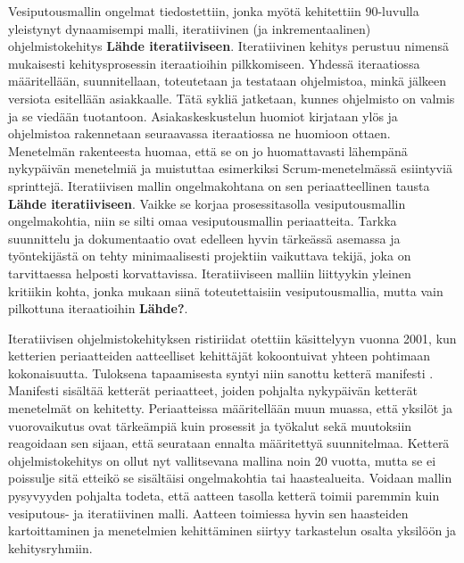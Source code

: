 Vesiputousmallin ongelmat tiedostettiin, jonka myötä kehitettiin 90-luvulla yleistynyt dynaamisempi malli, iteratiivinen (ja inkrementaalinen) ohjelmistokehitys \textbf{Lähde iteratiiviseen}. Iteratiivinen kehitys perustuu nimensä mukaisesti kehitysprosessin iteraatioihin pilkkomiseen. Yhdessä iteraatiossa määritellään, suunnitellaan, toteutetaan ja testataan ohjelmistoa, minkä jälkeen versiota esitellään asiakkaalle. Tätä sykliä jatketaan, kunnes ohjelmisto on valmis ja se viedään tuotantoon. Asiakaskeskustelun huomiot kirjataan ylös ja ohjelmistoa rakennetaan seuraavassa iteraatiossa ne huomioon ottaen. Menetelmän rakenteesta huomaa, että se on jo huomattavasti lähempänä nykypäivän menetelmiä ja muistuttaa esimerkiksi Scrum-menetelmässä \cite{SCRUMORG} esiintyviä sprinttejä. Iteratiivisen mallin ongelmakohtana on sen periaatteellinen tausta \textbf{Lähde iteratiiviseen}. Vaikke se korjaa prosessitasolla vesiputousmallin ongelmakohtia, niin se silti omaa vesiputousmallin periaatteita. Tarkka suunnittelu ja dokumentaatio ovat edelleen hyvin tärkeässä asemassa ja työntekijästä on tehty minimaalisesti projektiin vaikuttava tekijä, joka on tarvittaessa helposti korvattavissa. Iteratiiviseen malliin liittyykin yleinen kritiikin kohta, jonka mukaan siinä toteutettaisiin vesiputousmallia, mutta vain pilkottuna iteraatioihin \textbf{Lähde?}. 

Iteratiivisen ohjelmistokehityksen ristiriidat otettiin käsittelyyn vuonna 2001, kun ketterien periaatteiden aatteelliset kehittäjät kokoontuivat yhteen pohtimaan kokonaisuutta. Tuloksena tapaamisesta syntyi niin sanottu ketterä manifesti \cite{beck2001agile}. Manifesti sisältää ketterät periaatteet, joiden pohjalta nykypäivän ketterät menetelmät on kehitetty. Periaatteissa määritellään muun muassa, että yksilöt ja vuorovaikutus ovat tärkeämpiä kuin prosessit ja työkalut sekä muutoksiin reagoidaan sen sijaan, että seurataan ennalta määritettyä suunnitelmaa. Ketterä ohjelmistokehitys on ollut nyt vallitsevana mallina noin 20 vuotta, mutta se ei poissulje sitä etteikö se sisältäisi ongelmakohtia tai haastealueita. Voidaan mallin pysyvyyden pohjalta todeta, että aatteen tasolla ketterä toimii paremmin kuin vesiputous- ja iteratiivinen malli. Aatteen toimiessa hyvin sen haasteiden kartoittaminen ja menetelmien kehittäminen siirtyy tarkastelun osalta yksilöön ja kehitysryhmiin.

